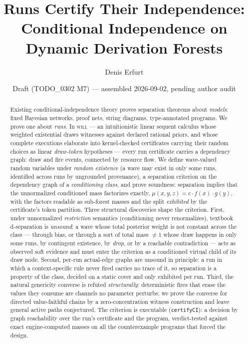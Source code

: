 \documentclass[11pt]{article}
\title{Runs Certify Their Independence:\\
  Conditional Independence on Dynamic Derivation Forests}
\author{Denis Erfurt}
\date{Draft (TODO\_0302 M7) --- assembled 2026-09-02, pending author audit}
\newcommand{\will}{\textsc{will}}
\theoremstyle{definition}
\theoremstyle{remark}
\begin{document}
\maketitle

\begin{abstract}
Existing conditional-independence theory proves separation theorems
about \emph{models}: fixed Bayesian networks, proof nets, string
diagrams, type-annotated programs.  We prove one about \emph{runs}.
In \will{} --- an intuitionistic linear sequent calculus whose weighted
existential draws witnesses against declared rational priors, and whose
complete executions elaborate into kernel-checked certificates carrying
their random choices as linear \emph{draw-token} hypotheses --- every
run certificate carries a dependency graph: draw and fire events,
connected by resource flow.  We define wave-valued random variables
under \emph{random existence} (a wave may exist in only some runs,
identified across runs by ungrounded provenance), a separation
criterion on the dependency graph of a \emph{conditioning class}, and
prove soundness: separation implies that the unnormalized conditioned
mass factorizes exactly, $\mu(x,y,z) = c\cdot f(x)\cdot g(y)$, with the
factors readable as sub-forest masses and the split \emph{exhibited} by
the certificate's token partition.  Three structural discoveries shape
the criterion.  First, under unnormalized \emph{restriction} semantics
(conditioning never renormalizes), textbook d-separation is
\emph{unsound}: a wave whose total posterior weight is not constant
across the class --- through bias, or through a sort of total mass
$\neq 1$ whose draw happens in only some runs, by contingent existence,
by \emph{drop}, or by a reachable contradiction --- acts as observed
soft evidence and must enter the criterion as a conditioned virtual
child of its draw node.  Second, per-run actual-edge graphs are
unsound in principle: a run in which a context-specific rule never
fired carries no trace of it, so separation is a property of the
class, decided on a static cover and only exhibited per run.  Third,
the natural genericity converse is refuted \emph{structurally}:
deterministic fires that erase the values they consume are channels no
parameter perturbs; we prove the converse for directed value-faithful
chains by a zero-concentration witness construction and leave general
active paths conjectured.  The criterion is executable
(\texttt{certifyCI}): a decision by graph reachability over the run's
certificate and the program, verdict-tested against exact engine-computed
masses on all the counterexample programs that forced the design.
\end{abstract}
\end{document}
